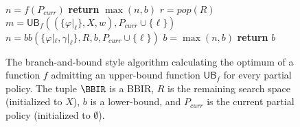 
\begin{figure}
  \begin{mdframed}{\footnotesize\begin{algorithmic}[1]
      \State $n = f(P_{curr})$
      \State \textbf{return } $\max(n, b)$
    \Else
       \State $r = pop(R)$
        \State $m = \mathsf{UB}_f((\{\varphi|_{\ell}\}, X, w), P_{curr} \cup \{\ell\})$\label{line:join}
         \label{line:prune}
          \State $n = bb(\{\varphi|_{\ell}, \gamma|_{\ell}\}, R, b, P_{curr} \cup \{\ell\})$
          \State $b = \max(n,b)$
        \EndIf
       \EndFor
       \State \textbf{return } $b$
    \EndIf
  \EndProcedure
  \end{algorithmic}}\end{mdframed}
  \caption{The branch-and-bound style algorithm
  calculating the optimum of a function $f$ admitting an upper-bound function
  $\mathsf{UB}_f$ for every partial policy.
  The tuple $\BBIR$ is a BBIR,
  $R$ is the remaining search space (initialized to $X$),
  $b$ is a lower-bound,
  and $P_{curr}$ is the current partial policy (initialized to $\emptyset$).}
  \label{algorithm:bb}
\end{figure}

